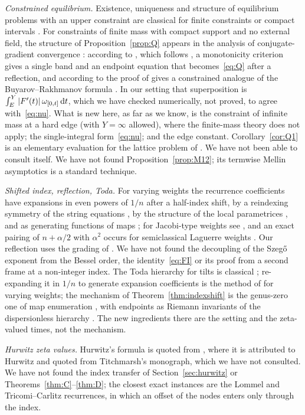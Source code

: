 \emph{Constrained equilibrium.} Existence, uniqueness and structure of equilibrium problems with an upper constraint are classical for
finite constraints or compact intervals \cite{Rakhmanov,DragnevSaff}. For constraints of finite mass with compact support and no external
field, the structure of Proposition~\ref{prop:Q} appears in the analysis of conjugate-gradient convergence \cite{BeckermannKuijlaars2001}:
according to \cite[Lemma~1.5]{BeckermannHelart}, which follows \cite[Lemma~3.1(a)]{BeckermannKuijlaars2001}, a monotonicity criterion gives a
single band and an endpoint equation that becomes~\eqref{eq:Q} after a reflection, and according to \cite{BeckermannGuettel,BeckermannKuijlaars2002}
the proof of \cite[Theorem~2.1]{BeckermannKuijlaars2001} gives a constrained analogue of the Buyarov--Rakhmanov formula \cite{BuyarovRakhmanov}.
In our setting that superposition is $\int_E^Y|F'(t)|\,\omega_{[0,t]}\,\mathrm{d} t$, which we have checked numerically, not proved, to agree
with~\eqref{eq:nu}. What is new here, as far as we know, is the constraint of infinite mass at a hard edge (with $Y=\infty$ allowed), where the
finite-mass theory does not apply; the single-integral form~\eqref{eq:nu}; and the edge constant. Corollary~\ref{cor:Q1} is an elementary
evaluation for the lattice problem of \cite[Theorem~1.3]{PaperI}. We have not been able to consult \cite{BeckermannKuijlaars2001} itself. We have
not found Proposition~\ref{prop:M12}; its termwise Mellin asymptotics is a standard technique.

\emph{Shifted index, reflection, Toda.} For varying weights the recurrence coefficients have expansions in even powers of $1/n$ after a
half-index shift, by a reindexing symmetry of the string equations \cite{BleherIts}, by the structure of the local parametrices
\cite{KuijlaarsTibboel}, and as generating functions of maps \cite{EMP}; for Jacobi-type weights see \cite{KMVV}, and an exact pairing of
$n+\alpha/2$ with $\alpha^2$ occurs for semiclassical Laguerre weights \cite{FilipukVanAsscheZhang}. Our reflection uses the grading of
\cite[Lemma~4.1]{KuijlaarsTibboel}. We have not found the decoupling of the Szeg\H{o} exponent from the Bessel order, the identity~\eqref{eq:FI}
or its proof from a second frame at a non-integer index. The Toda hierarchy for tilts is classical \cite{VanAsscheToda}; re-expanding it in
$1/n$ to generate expansion coefficients is the method of \cite[Section~4]{EMP} for varying weights; the mechanism of
Theorem~\ref{thm:indexshift} is the genus-zero one of map enumeration \cite{Ercolani,EMP,Bouttier}, with endpoints as Riemann invariants of the
dispersionless hierarchy \cite{KonopelchenkoMAM}. The new ingredients there are the setting and the zeta-valued times, not the mechanism.

\emph{Hurwitz zeta values.} Hurwitz's formula is quoted from \cite[Theorem~1.1]{DixitKumar}, where it is attributed to Hurwitz and quoted from
Titchmarsh's monograph, which we have not consulted. We have not found the index transfer of Section~\ref{sec:hurwitz} or
Theorems~\ref{thm:C}--\ref{thm:D}; the closest exact instances are the Lommel and Tricomi--Carlitz recurrences, in which an offset of the nodes
enters only through the index.

